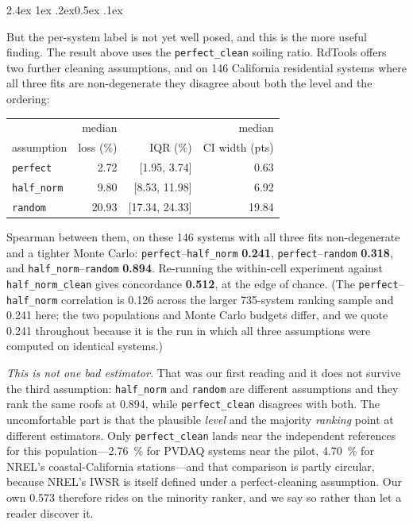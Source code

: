 \documentclass[10pt,twocolumn]{article}
\makeatletter
\renewcommand\paragraph{\@startsection{paragraph}{4}{\z@}%
  {2.4ex \@plus1ex \@minus.2ex}{0.5ex \@plus .1ex}%
  {\normalfont\normalsize\bfseries\raggedright}}
\makeatother
\begin{document}
\paragraph{But the per-system label is not yet well posed, and this is the more useful
finding.} The result above uses the \texttt{perfect\_clean} soiling ratio. RdTools offers
two further cleaning assumptions, and on 146 California residential systems where all three
fits are non-degenerate they disagree about both the level and the ordering:

\begin{center}\small
\setlength{\tabcolsep}{4pt}
\begin{tabular}{@{}lrrr@{}}
\toprule
 & median & & median \\
assumption & loss (\%) & IQR (\%) & CI width (pts) \\
\midrule
\texttt{perfect}   & 2.72  & [1.95, 3.74]   & 0.63 \\
\texttt{half\_norm} & 9.80  & [8.53, 11.98]  & 6.92 \\
\texttt{random}    & 20.93 & [17.34, 24.33] & 19.84 \\
\bottomrule
\end{tabular}
\end{center}

\noindent
Spearman between them, on these 146 systems with all three fits non-degenerate and a
tighter Monte Carlo: \texttt{perfect}--\texttt{half\_norm} \textbf{0.241},
\texttt{perfect}--\texttt{random} \textbf{0.318}, and
\texttt{half\_norm}--\texttt{random} \textbf{0.894}. Re-running the within-cell experiment
against \texttt{half\_norm\_clean} gives concordance \textbf{0.512}, at the edge of chance.
(The \texttt{perfect}--\texttt{half\_norm} correlation is 0.126 across the larger
735-system ranking sample and 0.241 here; the two populations and Monte Carlo budgets
differ, and we quote 0.241 throughout because it is the run in which all three assumptions
were computed on identical systems.)

\emph{This is not one bad estimator.} That was our first reading and it does not survive
the third assumption: \texttt{half\_norm} and \texttt{random} are different assumptions and
they rank the same roofs at 0.894, while \texttt{perfect\_clean} disagrees with both.
The uncomfortable part is that the plausible \emph{level} and the majority \emph{ranking}
point at different estimators. Only \texttt{perfect\_clean} lands near the independent
references for this population---\SI{2.76}{\percent} for PVDAQ systems near the pilot,
\SI{4.70}{\percent} for NREL's coastal-California stations---and that comparison is partly
circular, because NREL's IWSR is itself defined under a perfect-cleaning assumption. Our
own 0.573 therefore rides on the minority ranker, and we say so rather than let a reader
discover it.
\end{document}
